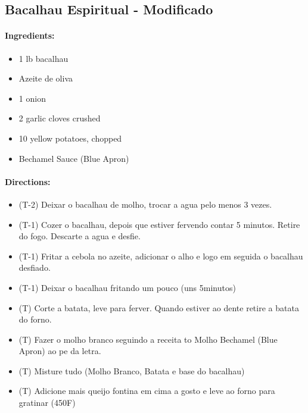 \documentclass{article}
\begin{document}
\subsection{Bacalhau Espiritual - Modificado}

\paragraph{Ingredients:}

\begin{itemize}
	\item 1 lb bacalhau
	\item Azeite de oliva
	\item 1 onion
	\item 2 garlic cloves crushed
	\item 10 yellow potatoes, chopped
	\item Bechamel Sauce (Blue Apron)
\end{itemize}

\paragraph{Directions:}
\begin{itemize}
	\item (T-2) Deixar o bacalhau de molho, trocar a agua pelo menos 3 vezes.
	\item (T-1) Cozer o bacalhau, depois que estiver fervendo contar 5 minutos. Retire do fogo. Descarte a agua e desfie.
	\item (T-1) Fritar a cebola no azeite, adicionar o alho e logo em seguida o bacalhau desfiado.
	\item (T-1) Deixar o bacalhau fritando um pouco (uns 5minutos)
	\item (T) Corte a batata, leve para ferver. Quando estiver ao dente retire a batata do forno.
	\item (T) Fazer o molho branco seguindo a receita to Molho Bechamel (Blue Apron) ao pe da letra.
	\item (T) Misture tudo (Molho Branco, Batata e base do bacalhau)
	\item (T) Adicione mais queijo fontina em cima a gosto e leve ao forno para gratinar (450F)
\end{itemize}
\end{document}
